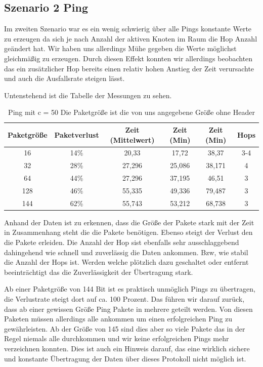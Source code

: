 \documentclass[]{scrartcl}
\begin{document}
\subsection{Szenario 2 Ping}

Im zweiten Szenario war es ein wenig schwierig über alle Pings konstante Werte zu erzeugen da sich je nach Anzahl der aktiven Knoten im Raum die Hop Anzahl geändert hat. Wir haben uns allerdings Mühe gegeben die Werte möglichst gleichmäßig zu erzeugen. Durch diesen Effekt konnten wir allerdings beobachten das ein zusätzlicher Hop bereits einen relativ hohen Anstieg der Zeit verursachte und auch die Ausfallsrate steigen lässt.

Untenstehend ist die Tabelle der Messungen zu sehen.

\begin{table}[H]
\centering
\begin{tabular}{|c|c|c|c|c|c|}
  \hline
  \textbf{Paketgröße} & \textbf{Paketverlust} & \textbf{Zeit (Mittelwert)} & \textbf{Zeit (Min)} & \textbf{Zeit (Min)} & \textbf{Hops} \\
  \hline
   16 & 14\% & 20,33 & 17,72 & 38,37 & 3-4\\
  \hline
   32 & 28\% & 27,296 & 25,086 & 38,171 & 4\\
  \hline
   64 & 44\% & 27,296 & 37,195 & 46,51 & 3\\
  \hline
   128 & 46\% & 55,335 & 49,336 & 79,487 & 3\\
  \hline
   144 & 62\% & 55,743 & 53,212 & 68,738 & 3\\
  \hline
\end{tabular}
	\caption{Ping mit c = 50 Die Paketgröße ist die von uns angegebene Größe ohne Header}
\end{table}

Anhand der Daten ist zu erkennen, dass die Größe der Pakete stark mit der Zeit in Zusammenhang steht die die Pakete benötigen. Ebenso steigt der Verlust den die Pakete erleiden. Die Anzahl der Hop sist ebenfalls sehr ausschlaggebend dahingehend wie schnell und zuverlässig die Daten ankommen. Bzw, wie stabil die Anzahl der Hops ist. Werden welche plötzlich dazu geschaltet oder entfernt beeinträchtigt das die Zuverlässigkeit der Übertragung stark.

Ab einer Paketgröße von 144 Bit ist es praktisch unmöglich Pings zu übertragen, die Verlustrate steigt dort auf ca. 100 Prozent. Das führen wir darauf zurück, dass ab einer gewissen Größe Ping Pakete in mehrere geteilt werden. Von diesen Paketen müssen allerdings alle ankommen um einen erfolgreichen Ping zu gewährleisten. Ab der Größe von 145 sind dies aber so viele Pakete das in der Regel niemals alle durchkommen und wir keine erfolgreichen Pings mehr verzeichnen konnten. Dies ist auch ein Hinweis darauf, das eine wirklich sichere und konstante Übertragung der Daten über dieses Protokoll nicht möglich ist.
\end{document}
